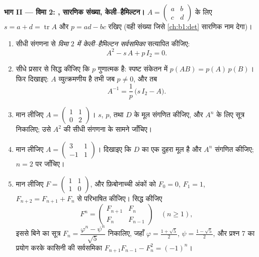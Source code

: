 \begin{problem}
\medskip \noindent\textbf{भाग II --- विमा 2: , सारणिक संख्या,
केली--हैमिल्टन।} $A = \begin{pmatrix} a & b\\ c & d\end{pmatrix}$ के लिए $s
= a + d = \operatorname{tr} A$ और $p = ad - bc$ रखिए (वही संख्या जिसे
\cref{ch:b1:det} सारणिक नाम देगा)।
\begin{enumerate}[resume]
  \item सीधी संगणना से \emph{विमा $2$ में केली--हैमिल्टन सर्वसमिका} सत्यापित
  कीजिए:
        \[
        A^2 - s\,A + p\,I_2 = 0 .
        \]
  \item सीधे प्रसार से सिद्ध कीजिए कि $p$ गुणात्मक है: स्पष्ट संकेतन में
  $p(AB) = p(A)\,p(B)$। फिर दिखाइए: $A$ व्युत्क्रमणीय है तभी जब $p \neq 0$,
  और तब
        \[
        A^{-1} = \frac1p\,\bigl(s\,I_2 - A\bigr).
        \]
  \item मान लीजिए $A = \begin{pmatrix} 1 & 1\\ 0 & 2\end{pmatrix}$। $s$,
  $p$, तथा $D$ के मूल संगणित कीजिए, और $A^n$ के लिए  सूत्र निकालिए; उसे
  $A^2$ की सीधी संगणना के सामने जाँचिए।
  \item मान लीजिए $A = \begin{pmatrix} 3 & 1\\ -1 & 1\end{pmatrix}$। दिखाइए
  कि $D$ का एक दुहरा मूल है और $A^n$ संगणित कीजिए; $n = 2$ पर जाँचिए।
  \item मान लीजिए $F = \begin{pmatrix} 1 & 1\\ 1 & 0\end{pmatrix}$, और
  फ़िबोनाच्ची अंकों को $F_0 = 0$, $F_1 = 1$, $F_{n+2} = F_{n+1} + F_n$ से
  परिभाषित कीजिए। सिद्ध कीजिए
        \[
        F^n = \begin{pmatrix} F_{n+1} & F_n\\ F_n &
        F_{n-1}\end{pmatrix} \quad (n \geq 1),
        \]
        इससे बिने का सूत्र $F_n = \dfrac{\varphi^n - \psi^n}{\sqrt5}$
        निकालिए, जहाँ $\varphi = \frac{1 + \sqrt5}2$, $\psi = \frac{1 -
        \sqrt5}2$, और प्रश्न 7 का प्रयोग करके कासिनी की सर्वसमिका
        $F_{n+1}F_{n-1} - F_n^2 = (-1)^n$।
\end{enumerate}


\end{problem}
